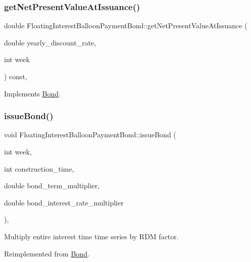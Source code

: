 \subsubsection{\texorpdfstring{get\+Net\+Present\+Value\+At\+Issuance()}{getNetPresentValueAtIssuance()}}
{\footnotesize\ttfamily double Floating\+Interest\+Balloon\+Payment\+Bond\+::get\+Net\+Present\+Value\+At\+Issuance (\begin{DoxyParamCaption}\item[{double}]{yearly\+\_\+discount\+\_\+rate,  }\item[{int}]{week }\end{DoxyParamCaption}) const\hspace{0.3cm}{\ttfamily [override]}, {\ttfamily [virtual]}}



Implements \mbox{\hyperlink{classBond_a5997278813deb16aa5d01bbca8ecc7b2_a5997278813deb16aa5d01bbca8ecc7b2}{Bond}}.

\mbox{\label{classFloatingInterestBalloonPaymentBond_a4cf110f320c92f5eca9aed952e0b527a_a4cf110f320c92f5eca9aed952e0b527a}} 
\subsubsection{\texorpdfstring{issue\+Bond()}{issueBond()}}
{\footnotesize\ttfamily void Floating\+Interest\+Balloon\+Payment\+Bond\+::issue\+Bond (\begin{DoxyParamCaption}\item[{int}]{week,  }\item[{int}]{construction\+\_\+time,  }\item[{double}]{bond\+\_\+term\+\_\+multiplier,  }\item[{double}]{bond\+\_\+interest\+\_\+rate\+\_\+multiplier }\end{DoxyParamCaption})\hspace{0.3cm}{\ttfamily [override]}, {\ttfamily [virtual]}}

Multiply entire interest time time series by R\+DM factor. 

Reimplemented from \mbox{\hyperlink{classBond_a377db8c18b83c4666e46686bc26adef1_a377db8c18b83c4666e46686bc26adef1}{Bond}}.



